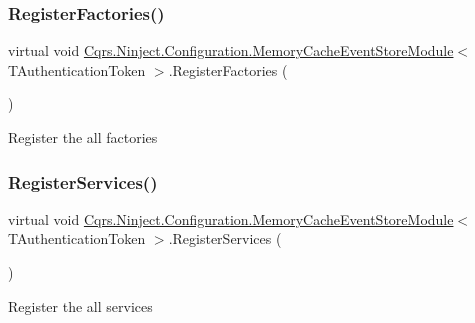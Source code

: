 \subsubsection{\texorpdfstring{Register\+Factories()}{RegisterFactories()}}
{\footnotesize\ttfamily virtual void \hyperlink{classCqrs_1_1Ninject_1_1Configuration_1_1MemoryCacheEventStoreModule}{Cqrs.\+Ninject.\+Configuration.\+Memory\+Cache\+Event\+Store\+Module}$<$ T\+Authentication\+Token $>$.Register\+Factories (\begin{DoxyParamCaption}{ }\end{DoxyParamCaption})\hspace{0.3cm}{\ttfamily [virtual]}}



Register the all factories 

\mbox{\label{classCqrs_1_1Ninject_1_1Configuration_1_1MemoryCacheEventStoreModule_a114a0b9bd65f7d8554ab8aff173d0d3a_a114a0b9bd65f7d8554ab8aff173d0d3a}} 
\subsubsection{\texorpdfstring{Register\+Services()}{RegisterServices()}}
{\footnotesize\ttfamily virtual void \hyperlink{classCqrs_1_1Ninject_1_1Configuration_1_1MemoryCacheEventStoreModule}{Cqrs.\+Ninject.\+Configuration.\+Memory\+Cache\+Event\+Store\+Module}$<$ T\+Authentication\+Token $>$.Register\+Services (\begin{DoxyParamCaption}{ }\end{DoxyParamCaption})\hspace{0.3cm}{\ttfamily [virtual]}}



Register the all services 

